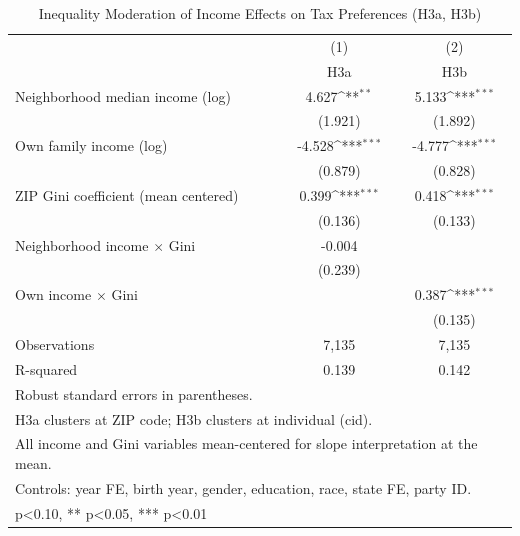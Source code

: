 \begin{table}[htbp]\centering
\def\sym#1{\ifmmode^{#1}\else\(^{#1}\)\fi}
\caption{Inequality Moderation of Income Effects on Tax Preferences (H3a, H3b)}
\begin{tabular}{l*{2}{c}}
\toprule
            &\multicolumn{1}{c}{(1)}&\multicolumn{1}{c}{(2)}\\
            &\multicolumn{1}{c}{H3a}&\multicolumn{1}{c}{H3b}\\
\midrule
Neighborhood median income (log)&       4.627\sym{**} &       5.133\sym{***}\\
            &     (1.921)         &     (1.892)         \\
Own family income (log)&      -4.528\sym{***}&      -4.777\sym{***}\\
            &     (0.879)         &     (0.828)         \\
ZIP Gini coefficient (mean centered)&       0.399\sym{***}&       0.418\sym{***}\\
            &     (0.136)         &     (0.133)         \\
Neighborhood income $\times$ Gini&      -0.004         &                     \\
            &     (0.239)         &                     \\
Own income $\times$ Gini&                     &       0.387\sym{***}\\
            &                     &     (0.135)         \\
\midrule
Observations&       7,135         &       7,135         \\
R-squared   &       0.139         &       0.142         \\
\bottomrule
\multicolumn{3}{l}{\footnotesize Robust standard errors in parentheses.}\\
\multicolumn{3}{l}{\footnotesize H3a clusters at ZIP code; H3b clusters at individual (cid).}\\
\multicolumn{3}{l}{\footnotesize All income and Gini variables mean-centered for slope interpretation at the mean.}\\
\multicolumn{3}{l}{\footnotesize Controls: year FE, birth year, gender, education, race, state FE, party ID.}\\
\multicolumn{3}{l}{\footnotesize * p<0.10, ** p<0.05, *** p<0.01}\\
\end{tabular}
\end{table}
